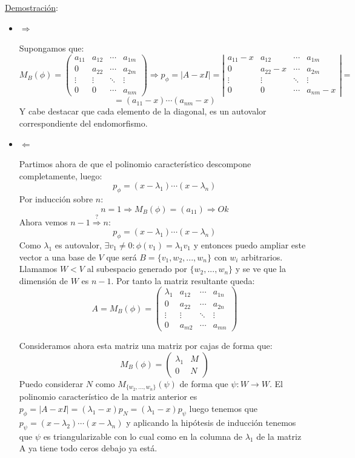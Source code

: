\documentclass[10pt,a4paper,openright]{book}
\begin{document}
\underline{Demostración}:
\begin{itemize}
\item $\Rightarrow$

Supongamos que:
$$M_B(\phi)=\begin{pmatrix}
a_{11} & a_{12} & \cdots & a_{1m}\\
0 & a_{22} & \cdots & a_{2m} \\
\vdots & \vdots & \ddots & \vdots \\
0 &0&\cdots &a_{nm}
\end{pmatrix}\Rightarrow p_\phi=|A-xI|=\left|\begin{array}{cccc}
a_{11}-x & a_{12} & \cdots & a_{1m}\\
0 & a_{22}-x & \cdots & a_{2m} \\
\vdots & \vdots & \ddots & \vdots \\
0 &0&\cdots &a_{nm}-x
\end{array} \right|=$$
$$=(a_11-x)\cdots(a_{nm}-x)$$
Y cabe destacar que cada elemento de la diagonal, es un autovalor correspondiente del endomorfismo.

\item $\Leftarrow$

Partimos ahora de que el polinomio característico descompone completamente, luego:
$$p_\phi=(x-\lambda_1)\cdots (x-\lambda_n)$$
Por inducción sobre $n$:
$$n=1\Rightarrow M_B(\phi)=(a_{11})\Rightarrow Ok$$
Ahora vemos $n-1\stackrel{?}{\Rightarrow} n$:
$$p_\phi =(x-\lambda_1)\cdots (x-\lambda_n)$$
Como $\lambda_1$ es autovalor, $\exists v_1\neq 0: \phi(v_1)=\lambda_1v_1$ y entonces puedo ampliar este vector a una base de $V$ que será $B=\{v_1, w_2, ..., w_n\}$ con $w_i$ arbitrarios. Llamamos $W<V$ al subespacio generado por $\{w_2, ..., w_n\}$ y se ve que la dimensión de $W$ es $n-1$. Por tanto la matriz resultante queda:
$$A=M_B(\phi)=\begin{pmatrix}
\lambda_1 &a_{12} &\cdots & a_{1n} \\
0 & a_{22} & \cdots & a_{2n}\\
\vdots & \vdots & \ddots & \vdots \\
0 & a_{m2} & \cdots & a_{mn}
\end{pmatrix}$$

Consideramos ahora esta matriz una matriz por cajas de forma que:
$$M_B(\phi)=\begin{pmatrix}
\lambda_1 & M\\
0 & N
\end{pmatrix}$$
Puedo considerar $N$ como $M_{\{w_2, ...,w_n\}}(\psi)$ de forma que $\psi: W\rightarrow W$. El polinomio característico de la matriz anterior es $p_\phi=|A-xI|=(\lambda_1-x)p_N=(\lambda_1-x)p_\psi$ luego tenemos que $p_\psi = (x-\lambda_2)\cdots (x-\lambda_n)$ y aplicando la hipótesis de inducción tenemos que $\psi$ es triangularizable con lo cual como en la columna de $\lambda_1$ de la matriz A ya tiene todo ceros debajo ya está.

\end{itemize}
\end{document}

